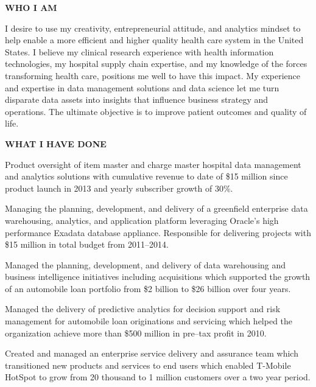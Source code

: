 \documentclass{article}
\newcommand{\sbt}{\,\begin{picture}(-1,1)(-1,-3)\circle*{3}\end{picture}\ }
\newenvironment{tightcenter}{%
  \setlength\topsep{0pt}
  \setlength\parskip{10pt}
  \begin{center}
}{%
  \end{center}
}
\begin{document}
\begin{tightcenter}
{\bfseries \large WHO I AM}
\end{tightcenter}

\noindent
I desire to use my creativity, entrepreneurial attitude, and analytics mindset to help enable a more efficient and higher quality health care system in the United States. I believe my clinical research experience with health information technologies, my hospital supply chain expertise, and my knowledge of the forces transforming health care,  positions me well to have this impact. My experience and expertise in data management solutions and data science let me turn disparate data assets into insights that influence business strategy and operations. The ultimate objective is to improve patient outcomes and quality of life.

\begin{tightcenter}
{\bfseries \large WHAT I HAVE DONE}
\end{tightcenter}

\begin{compactitem}

\item[\sbt] Product oversight of item master and charge master hospital data management and analytics solutions with cumulative revenue to date of \$15 million since product launch in 2013 and yearly subscriber growth of 30\%.
\item[\sbt] Managing the planning, development, and delivery of a greenfield enterprise data warehousing, analytics, and application platform leveraging Oracle's high performance Exadata database appliance. Responsible for delivering projects with \$15 million in total budget from 2011--2014.
\item[\sbt] Managed the planning, development, and delivery of data warehousing and business intelligence initiatives including acquisitions which supported the growth of an automobile loan portfolio from \$2 billion to \$26 billion over four years.
\item[\sbt] Managed the delivery of predictive analytics for decision support and risk management for automobile loan originations and servicing which helped the organization achieve more than \$500 million in pre--tax profit in 2010.
\item[\sbt] Created and managed an enterprise service delivery and assurance team which transitioned new products and services to end users which enabled T-Mobile HotSpot to grow from 20 thousand to 1 million customers over a two year period.

\end{compactitem}
\end{document}
